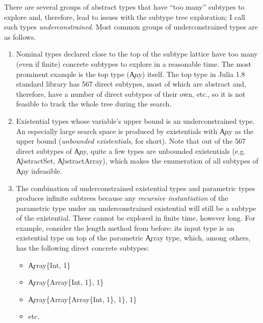 There are several groups of abstract types that have ``too many'' subtypes to explore
and, therefore, lead to issues with the subtype tree exploration; I call such
types \emph{underconstrained}. Most common groups of underconstrained types are
as follows.
\begin{enumerate}

  \item Nominal types declared close to the top of the subtype lattice
    have too many (even if finite) concrete subtypes to explore in a reasonable time.
    The most prominent example is the top type (\c{Any}) itself.
    The top type in Julia 1.8 standard library has 567 direct subtypes, most of
    which are abstract and, therefore, have a number of direct subtypes of
    their own, etc., so it is not feasible to track the whole tree during the search.

  \item Existential types whose variable's upper bound is an underconstrained
    type. An especially large search space is produced by existentials with \c{Any}
    as the upper bound (\emph{unbounded existentials}, for short).
    Note that out of the 567 direct subtypes of \c{Any},
    quite a few types are unbounded existentials (e.g. \c{AbstractSet},
    \c{AbstractArray}), which makes the enumeration of all subtypes of \c{Any}
    infeasible.


  \item The combination of underconstrained existential types and parametric
    types produces infinite subtrees because any \emph{recursive instantiation}
    of the parametric type under an underconstrained existential will still be a
    subtype of the existential. These cannot be explored in finite time, however
    long. For example, consider the \c{length} method from before: its input
    type is an existential type on top of the parametric \c{Array} type,
    which, among others, has the following direct concrete subtypes:
    \begin{itemize}
      \item \c{Array\{Int, 1\}}
      \item \c{Array\{Array\{Int, 1\}, 1\}}
      \item \c{Array\{Array\{Array\{Int, 1\}, 1\}, 1\}}
      \item etc.
    \end{itemize}

\end{enumerate}

